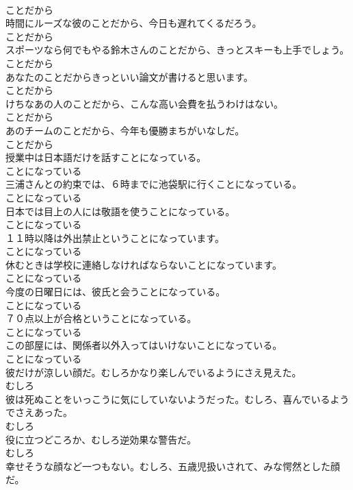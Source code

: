 \documentclass[8pt]{extreport}
\begin{document}
\begin{CJK}{UTF8}{min}
\\	ことだから
\\	時間にルーズな彼のことだから、今日も遅れてくるだろう。	
\\	ことだから
\\	スポーツなら何でもやる鈴木さんのことだから、きっとスキーも上手でしょう。	
\\	ことだから
\\	あなたのことだからきっといい論文が書けると思います。	
\\	ことだから
\\	けちなあの人のことだから、こんな高い会費を払うわけはない。	
\\	ことだから
\\	あのチームのことだから、今年も優勝まちがいなしだ。	
\\	ことだから
\\	授業中は日本語だけを話すことになっている。	
\\	ことになっている
\\	三浦さんとの約束では、６時までに池袋駅に行くことになっている。	
\\	ことになっている
\\	日本では目上の人には敬語を使うことになっている。	
\\	ことになっている
\\	１１時以降は外出禁止ということになっています。	
\\	ことになっている
\\	休むときは学校に連絡しなければならないことになっています。	
\\	ことになっている
\\	今度の日曜日には、彼氏と会うことになっている。	
\\	ことになっている
\\	７０点以上が合格ということになっている。	
\\	ことになっている
\\	この部屋には、関係者以外入ってはいけないことになっている。	
\\	ことになっている
\\	彼だけが涼しい顔だ。むしろかなり楽しんでいるようにさえ見えた。	
\\	むしろ
\\	彼は死ぬことをいっこうに気にしていないようだった。むしろ、喜んでいるようでさえあった。	
\\	むしろ
\\	役に立つどころか、むしろ逆効果な警告だ。	
\\	むしろ
\\	幸せそうな顔など一つもない。むしろ、五歳児扱いされて、みな愕然とした顔だ。	

\end{CJK}
\end{document}
